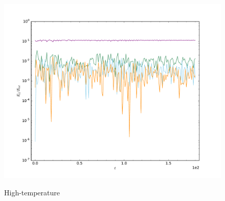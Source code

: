 \documentclass[mathserif,10pt]{beamer}
\begin{document}
{{\begin{columns}
\begin{figure}
{      \includegraphics[width=\textwidth]{HighTa1_779e-01j100T2_0000e+01_lowjevo}
      }
       \begin{center} High-temperature \end{center}
      \end{figure}
  \end{columns}
  }
}


\end{document}
